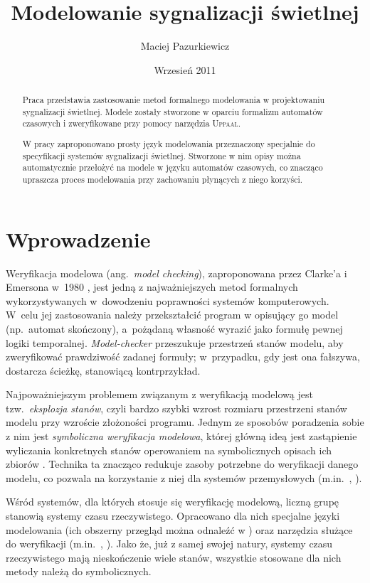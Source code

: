 \documentclass{pracamgr}
\author{Maciej Pazurkiewicz}
\title{Modelowanie sygnalizacji świetlnej}
\date{Wrzesień 2011}
\newcommand{\ang}[1]{(ang.~\emph{#1})}
\newcommand{\upp}{\textsc{Uppaal}}
\theoremstyle{plain}
\begin{document}
\maketitle

\begin{abstract}
  Praca przedstawia zastosowanie metod formalnego modelowania w
  projektowaniu sygnalizacji świetlnej. Modele zostały stworzone w
  oparciu formalizm automatów czasowych i zweryfikowane przy pomocy
  narzędzia \upp.

  W pracy zaproponowano prosty język modelowania przeznaczony
  specjalnie do specyfikacji systemów sygnalizacji
  świetlnej. Stworzone w nim opisy można automatycznie przełożyć na
  modele w języku automatów czasowych, co znacząco upraszcza proces
  modelowania przy zachowaniu płynących z niego korzyści.
\end{abstract}

\tableofcontents
{}
\chapter*{Wprowadzenie}

Weryfikacja modelowa \ang{model checking}, zaproponowana przez
Clarke'a i Emersona w~1980 \cite{clarke-emerson-mc}, jest jedną z
najważniejszych metod formalnych wykorzystywanych w~dowodzeniu
poprawności systemów komputerowych. W~celu jej zastosowania należy
przekształcić program w opisujący go model (np.~automat skończony),
a~pożądaną własność wyrazić jako formułę pewnej logiki
temporalnej. \emph{Model-checker} przeszukuje przestrzeń stanów
modelu, aby zweryfikować prawdziwość zadanej formuły; w~przypadku, gdy
jest ona fałszywa, dostarcza ścieżkę, stanowiącą kontrprzykład.

Najpoważniejszym problemem związanym z weryfikacją
modelową jest tzw.~\emph{eksplozja stanów}, czyli bardzo szybki wzrost
rozmiaru przestrzeni stanów modelu przy wzroście złożoności
programu. Jednym ze sposobów poradzenia sobie z nim jest
\emph{symboliczna weryfikacja modelowa}, której główną ideą jest
zastąpienie wyliczania konkretnych stanów operowaniem na symbolicznych
opisach ich zbiorów \cite{mcmillan-smc}. Technika ta znacząco redukuje
zasoby potrzebne do weryfikacji danego modelu, co pozwala na
korzystanie z niej dla systemów przemysłowych
(m.in.~\cite{smc-industry-1}, \cite{smc-industry-2}).

Wśród systemów, dla których stosuje się weryfikację modelową, liczną
grupę stanowią systemy czasu rzeczywistego. Opracowano dla nich
specjalne języki modelowania (ich obszerny przegląd można odnaleźć w
\cite{time-in-computing}) oraz narzędzia służące do weryfikacji
(m.in.~\cite{lpw:fct95}, \cite{kronos}). Jako że, już z samej swojej
natury, systemy czasu rzeczywistego mają nieskończenie wiele stanów,
wszystkie stosowane dla nich metody należą do symbolicznych.
\end{document}
